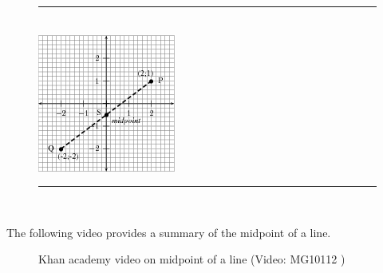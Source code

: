 	\begin{figure}[H] %
    \begin{center}
    \rule[.1in]{\figurerulewidth}{.005in} \\
        \label{m39119*uid45!!!underscore!!!media}\label{m39119*uid45!!!underscore!!!printimage}\includegraphics{col11306.imgs/m39119_MG10C14_020.png} %
      \vspace{2pt}
    \vspace{.1in}
    \rule[.1in]{\figurerulewidth}{.005in} \\
    \end{center}
 \end{figure}       \label{m39119*eip-891}The following video provides a summary of the midpoint of a line.
    \setcounter{subfigure}{0}
	\begin{figure}[H] %
    \textnormal{Khan academy video on midpoint of a line}\vspace{.1in} \nopagebreak
  \label{m39119*yt-media2}\label{m39119*yt-video2}
             { (Video:  MG10112 )}
      \vspace{2pt}
    \vspace{.1in}
 \end{figure}       \par \label{m39119**end}
%     
%     
%     
  \label{m39167*fs-id5760712}
